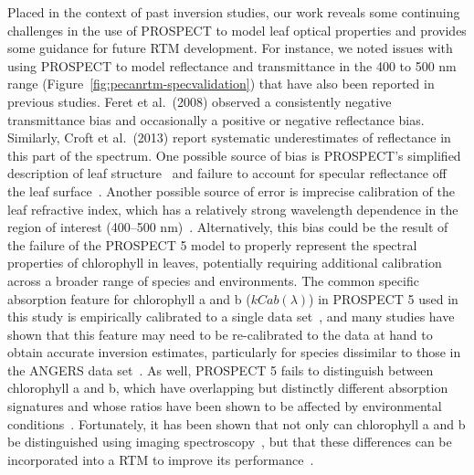 Placed in the context of past inversion studies, our work reveals some continuing challenges in the use of PROSPECT to model leaf optical properties and provides some guidance for future RTM development.
For instance, we noted issues with using PROSPECT to model reflectance and transmittance in the 400 to 500 nm range (Figure~\ref{fig:pecanrtm-specvalidation}) that have also been reported in previous studies.
Feret et al.~(2008) observed a consistently negative transmittance bias and occasionally a positive or negative reflectance bias. \nocite{feret_2008_prospect}
Similarly, Croft et al.~(2013) report systematic underestimates of reflectance in this part of the spectrum. \nocite{croft_2013_modelling}
One possible source of bias is PROSPECT's simplified description of leaf structure~\cite{jacquemoud_1990_prospect} and failure to account for specular reflectance off the leaf surface~\cite{grant_1987_diffuse}.
Another possible source of error is imprecise calibration of the leaf refractive index, which has a relatively strong wavelength dependence in the region of interest (400--500 nm)~\cite{feret_2008_prospect}.
Alternatively, this bias could be the result of the failure of the PROSPECT 5 model to properly represent the spectral properties of chlorophyll in leaves, potentially requiring additional calibration across a broader range of species and environments.
The common specific absorption feature for chlorophyll a and b ($kCab(\lambda)$) in PROSPECT 5 used in this study is empirically calibrated to a single data set~\cite[ANGERS; ][]{feret_2008_prospect},
and many studies have shown that this feature may need to be re-calibrated to the data at hand to obtain accurate inversion estimates,
particularly for species dissimilar to those in the ANGERS data set~\cite{malenovsky_2006_applicability,moorthy_2008_estimating,zhang_2008_retrieving,li_2013_retrieval}.
As well, PROSPECT 5 fails to distinguish between chlorophyll a and b, which have overlapping but distinctly different absorption signatures and whose ratios have been shown to be affected by environmental conditions~\cite{blackburn_2006_hyperspectral,divittorio_2009_spectral,divittorio_2009_enhancing}.
Fortunately, it has been shown that not only can chlorophyll a and b be distinguished using imaging spectroscopy~\cite{divittorio_2009_pigment}, but that these differences can be incorporated into a RTM to improve its performance~\cite{divittorio_2009_enhancing}.

